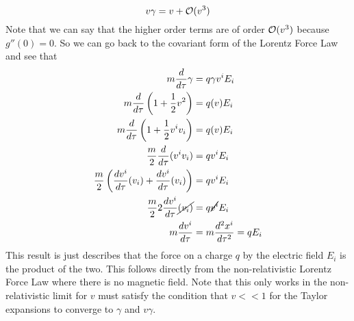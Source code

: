 \documentclass[11pt]{article}
\numberwithin{equation}{section}
\begin{document}
\begin{enumerate}[(a)]
$$v\gamma = v + \mathcal{O}(v^3)$$
Note that we can say that the higher order terms are of order $\mathcal{O}(v^3)$ because $g''(0) = 0$. So we can go back to the covariant form of the Lorentz Force Law and see that
\begin{align*}
m\frac{d}{d\tau}\gamma &= q\gamma v^iE_i\\
m\frac{d}{d\tau}\left(1+\frac{1}{2}v^2\right) &= q(v)E_i\\
m\frac{d}{d\tau}\left(1+\frac{1}{2}v^iv_i\right) &= q(v)E_i\\
\frac{m}{2}\frac{d}{d\tau}(v^iv_i) &= qv^iE_i\\
\frac{m}{2}\left(\frac{dv^i}{d\tau}(v_i) + \frac{dv^i}{d\tau}(v_i)\right) &= qv^iE_i\\
\frac{m}{2}2\frac{dv^i}{d\tau}\cancel{(v_i)} &= q\cancel{v^i}E_i\\
m\frac{dv^i}{d\tau} &= m\frac{d^2x^i}{d\tau^2} = qE_i
\end{align*}
This result is just describes that the force on a charge $q$ by the electric field $E_i$ is the product of the two. This follows directly from the non-relativistic Lorentz Force Law where there is no magnetic field. Note that this only works in the non-relativistic limit for $v$ must satisfy the condition that $v<<1$ for the Taylor expansions to converge to $\gamma$ and $v\gamma$.
\end{enumerate}
\end{document}
